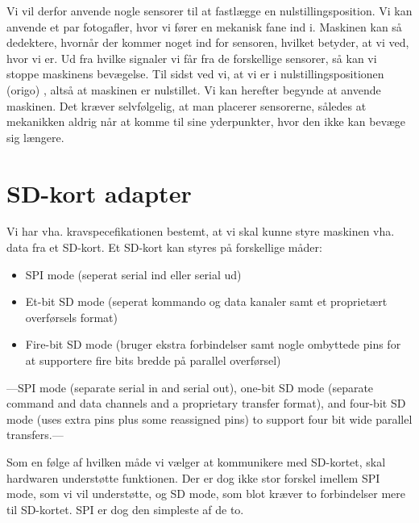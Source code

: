 Vi vil derfor anvende nogle sensorer til at fastlægge en nulstillingsposition.
Vi kan anvende et par fotogafler, hvor vi fører
en mekanisk fane ind i. Maskinen kan så dedektere, hvornår der kommer
noget ind for sensoren, hvilket betyder, at vi ved, hvor vi er. Ud fra
hvilke signaler vi får fra de forskellige sensorer, så kan vi stoppe
maskinens bevægelse. Til sidst ved vi, at vi er i nulstillingspositionen (origo)
, altså at maskinen er nulstillet. Vi kan herefter begynde at anvende
maskinen. Det kræver selvfølgelig, at man placerer sensorerne, således
at mekanikken aldrig når at komme til sine yderpunkter, hvor den ikke
kan bevæge sig længere.

\section{SD-kort adapter}
Vi har vha. kravspecefikationen bestemt, at vi skal kunne styre
maskinen vha. data fra et SD-kort. Et SD-kort kan styres på
forskellige måder:

\begin{itemize}
\item{SPI mode (seperat serial ind eller serial ud)}
\item{Et-bit SD mode (seperat kommando og data kanaler samt et
    proprietært overførsels format)}
\item{Fire-bit SD mode (bruger ekstra forbindelser samt nogle
    ombyttede pins for at supportere fire bits bredde på parallel
    overførsel)}
\end{itemize}

---SPI mode (separate serial in and serial out), one-bit SD mode
(separate command and data channels and a proprietary transfer
format), and four-bit SD mode (uses extra pins plus some reassigned
pins) to support four bit wide parallel transfers.---



Som en følge af hvilken måde vi vælger at kommunikere med SD-kortet,
skal hardwaren understøtte funktionen. Der er dog ikke stor forskel imellem
SPI mode, som vi vil understøtte, og SD mode, som blot kræver to
forbindelser mere til SD-kortet. SPI er dog den simpleste
af de to.

